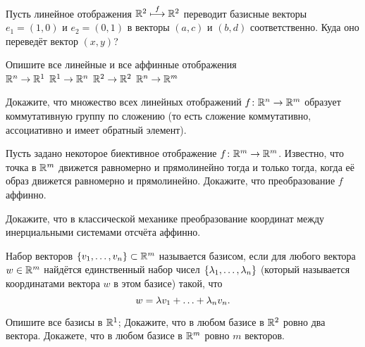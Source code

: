 \documentclass[a4paper,12pt]{article}
\begin{document}
  Пусть линейное отображения $\mathbb{R}^2\stackrel{f}{\longmapsto}\mathbb{R}^2$ переводит базисные векторы
  $e_1=(1,0)$ и $e_2=(0,1)$ в векторы $(a,c)$ и $(b,d)$ соответственно.
  Куда оно переведёт вектор $(x,y)$?

  Опишите все линейные и все аффинные отображения\\
   $\mathbb{R}^n\rightarrow\mathbb{R}^1$\hfill
   $\mathbb{R}^1\rightarrow\mathbb{R}^n$\hfill
   $\mathbb{R}^2\rightarrow\mathbb{R}^2$\hfill
   $\mathbb{R}^n\rightarrow\mathbb{R}^m$


Докажите, что множество всех линейных отображений $f\colon\mathbb{R}^n\rightarrow\mathbb{R}^m$ образует коммутативную группу по сложению (то есть сложение коммутативно, ассоциативно и имеет обратный элемент).

Пусть задано некоторое биективное отображение $f\colon \mathbb{R}^m\rightarrow\mathbb{R}^m$. Известно, что точка в $\mathbb{R}^m$ движется равномерно и прямолинейно тогда и только тогда, когда её образ движется равномерно и прямолинейно.
Докажите, что преобразование $f$ аффинно.

Докажите, что в классической механике преобразование координат между инерциальными системами отсчёта аффинно.


Набор векторов $\left\{v_1,\ldots, v_n\right\}\subset\mathbb{R}^m$ называется базисом, если для любого вектора $w\in\mathbb{R}^m$ найдётся единственный набор чисел $\left\{\lambda_1,\ldots,\lambda_n\right\}$ (который называется координатами вектора $w$ в этом базисе) такой, что
\vspace*{-2mm}
$$w = \lambda v_1 + \ldots + \lambda_n v_n.$$
\vspace*{-4mm}

Опишите все базисы в $\mathbb{R}^1$;
Докажите, что в любом базисе в $\mathbb{R}^2$ ровно два вектора.
Докажете, что в любом базисе в $\mathbb{R}^m$ ровно $m$ векторов.



\end{document}
